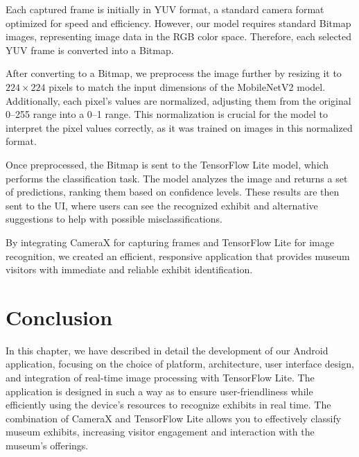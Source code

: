 Each captured frame is initially in YUV format, a standard camera format optimized for speed and efficiency. However, our model requires standard Bitmap images, representing image data in the RGB color space. Therefore, each selected YUV frame is converted into a Bitmap.

After converting to a Bitmap, we preprocess the image further by resizing it to $224 \times 224$ pixels to match the input dimensions of the MobileNetV2 model. Additionally, each pixel's values are normalized, adjusting them from the original 0--255 range into a 0--1 range. This normalization is crucial for the model to interpret the pixel values correctly, as it was trained on images in this normalized format.

Once preprocessed, the Bitmap is sent to the TensorFlow Lite model, which performs the classification task. The model analyzes the image and returns a set of predictions, ranking them based on confidence levels. These results are then sent to the UI, where users can see the recognized exhibit and alternative suggestions to help with possible misclassifications.

By integrating CameraX for capturing frames and TensorFlow Lite for image recognition, we created an efficient, responsive application that provides museum visitors with immediate and reliable exhibit identification.

\section{Conclusion}

In this chapter, we have described in detail the development of our Android application, focusing on the choice of platform, architecture, user interface design, and integration of real-time image processing with TensorFlow Lite. The application is designed in such a way as to ensure user-friendliness while efficiently using the device's resources to recognize exhibits in real time. The combination of CameraX and TensorFlow Lite allows you to effectively classify museum exhibits, increasing visitor engagement and interaction with the museum's offerings.